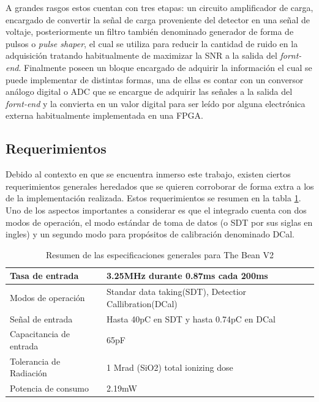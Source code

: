 \documentclass[11pt,letterpaper,spanish]{article}
\begin{document}
	
	


A grandes rasgos estos cuentan con tres etapas: un circuito amplificador de carga, encargado de convertir la señal de carga proveniente del detector en una señal de voltaje, posteriormente un filtro también denominado generador de forma de pulsos o \textit{pulse shaper}, el cual se utiliza para reducir la cantidad de ruido en la adquisición tratando habitualmente de maximizar la SNR a la salida del \textit{fornt-end}. Finalmente poseen un bloque encargado de adquirir la información el cual se puede implementar de distintas formas, una de ellas es contar con un conversor análogo digital o ADC que se encargue de adquirir las señales a la salida del \textit{fornt-end} y la convierta en un valor digital para ser leído por alguna electrónica externa habitualmente implementada en una FPGA.


\subsection{Requerimientos}
Debido al contexto en que se encuentra inmerso este trabajo, existen ciertos requerimientos generales heredados que se quieren corroborar de forma extra a los de la implementación realizada. Estos requerimientos se resumen en la tabla \ref{requerimientos}. 
Uno de los aspectos importantes a considerar es que el integrado cuenta con dos modos de operación, el modo estándar de toma de datos (o SDT por sus siglas en ingles) y un segundo modo para propósitos de calibración denominado DCal.




\begin{table}
\centering
\begin{tabular}{|l|l|}
\hline 
Tasa de entrada & 3.25MHz  durante 0.87ms cada 200ms \\ 
\hline 
Modos de operación & Standar data taking(SDT), Detectior Callibration(DCal) \\ 
\hline
Señal de entrada & Hasta 40pC en SDT y hasta 0.74pC en DCal\\
\hline 
Capacitancia de entrada & 65pF \\ 
\hline 
Tolerancia de Radiación & 1 Mrad (SiO2) total ionizing dose \\ 
\hline 
Potencia de consumo & 2.19mW \\ 
\hline 
\end{tabular} 
\caption{\label{requerimientos} Resumen de las especificaciones generales para The Bean V2}
\end{table}
\end{document}

